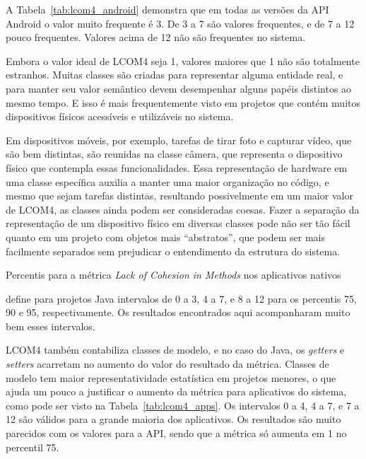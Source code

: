 A Tabela~\ref{tab:lcom4_android} demonstra que em todas as versões da API Android o valor muito frequente é 3. De 3 a 7 são valores frequentes, e de 7 a 12 pouco frequentes. Valores acima de 12 não são frequentes no sistema. 

Embora o valor ideal de LCOM4 seja 1, valores maiores que 1 não são totalmente estranhos. Muitas classes são criadas para representar alguma entidade real, e para manter seu valor semântico devem desempenhar alguns papéis distintos ao mesmo tempo. E isso é mais frequentemente visto em projetos que contém muitos dispositivos físicos acessíveis e utilizáveis no sistema. 

Em dispositivos móveis, por exemplo, tarefas de tirar foto e capturar vídeo, que são bem distintas, são reunidas na classe câmera, que representa o dispositivo físico que contempla essas funcionalidades. Essa representação de hardware em uma classe específica auxilia a manter uma maior organização no código, e mesmo que sejam tarefas distintas, resultando possivelmente em um maior valor de LCOM4, as classes ainda podem ser consideradas coesas. Fazer a separação da representação de um dispositivo físico em diversas classes pode não ser tão fácil quanto em um projeto com objetos mais ``abstratos'', que podem ser mais facilmente separados sem prejudicar o entendimento da estrutura do sistema.

\begin{table}[!htb]

\caption{Percentis para a métrica \textit{Lack of Cohesion in Methods} nos aplicativos nativos}
\label{tab:lcom4_apps}
\end{table}

 define para projetos Java intervalos de 0 a 3, 4 a 7, e 8 a 12 para os percentis 75, 90 e 95, respectivamente. Os resultados encontrados aqui acompanharam muito bem esses intervalos.

LCOM4 também contabiliza classes de modelo, e no caso do Java, os \textit{getters} e \textit{setters} acarretam no aumento do valor do resultado da métrica\cite{meirelles2013}. Classes de modelo tem maior representatividade estatística em projetos menores, o que ajuda um pouco a justificar o aumento da métrica para aplicativos do sistema, como pode ser visto na Tabela~\ref{tab:lcom4_apps}. Os intervalos 0 a 4, 4 a 7, e 7 a 12 são válidos para a grande maioria dos aplicativos. Os resultados são muito parecidos com os valores para a API, sendo que a métrica só aumenta em 1 no percentil 75.

